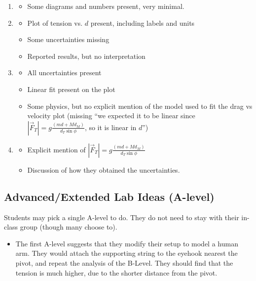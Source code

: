 \documentclass[fleqn,letterpaper]{article}
\begin{document}
\begin{enumerate}
 \item{
  \begin{itemize}
   \item{Some diagrams and numbers present, very minimal.}
  \end{itemize}
}
 \item{
  \begin{itemize}
   \item{Plot of tension vs. $d$ present, including labels and units}
   \item{Some uncertainties missing}
   \item{Reported results, but no interpretation}
  \end{itemize}
}
 \item{
  \begin{itemize}
   \item{All uncertainties present}
   \item{Linear fit present on the plot}
   \item{Some physics, but no explicit mention of the model used to fit the drag vs velocity plot (missing ``we expected it to be linear since $|\vec{F}_T| = g\frac{(m d  + M d_M)}{d_T \sin \phi}$, so it is linear in $d$'')}
  \end{itemize}
}
 \item{
  \begin{itemize}
   \item{Explicit mention of $|\vec{F}_T| = g\frac{(m d  + M d_M)}{d_T \sin \phi}$}
   \item{Discussion of how they obtained the uncertainties.}
  \end{itemize}
}
\end{enumerate}


\subsection*{Advanced/Extended Lab Ideas (A-level)}

Students may pick a single A-level to do.  They do not need to stay with their in-class group (though many choose to).

\begin{itemize}
 \item{The first A-level suggests that they modify their setup to model a human arm.  They would attach the supporting string to the eyehook nearest the pivot, and repeat the analysis of the B-Level.  They should find that the tension is much higher, due to the shorter distance from the pivot.}
\end{itemize}
\end{document}
